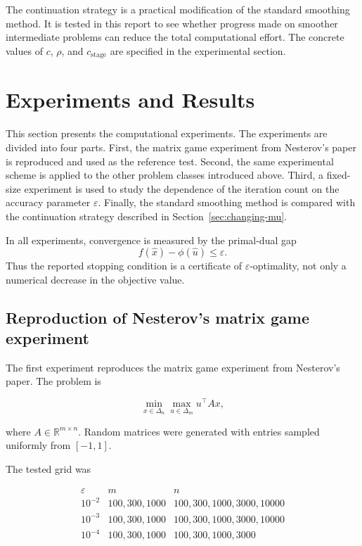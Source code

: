 \documentclass[11pt]{article}
\begin{document}
The continuation strategy is a practical modification of the standard smoothing
method. It is tested in this report to see whether progress made on smoother
intermediate problems can reduce the total computational effort. The concrete
values of \(c\), \(\rho\), and \(c_{\mathrm{stage}}\) are specified in the
experimental section.



\section{Experiments and Results}

This section presents the computational experiments. The experiments are divided
into four parts. First, the matrix game experiment from Nesterov's paper is
reproduced and used as the reference test. Second, the same experimental scheme
is applied to the other problem classes introduced above. Third, a fixed-size
experiment is used to study the dependence of the iteration count on the
accuracy parameter \(\varepsilon\). Finally, the standard smoothing method is
compared with the continuation strategy described in
Section~\ref{sec:changing-mu}.

In all experiments, convergence is measured by the primal-dual gap
\[
    f(\hat x)-\phi(\hat u)\le \varepsilon.
\]
Thus the reported stopping condition is a certificate of
\(\varepsilon\)-optimality, not only a numerical decrease in the objective
value.

\subsection{Reproduction of Nesterov's matrix game experiment}

The first experiment reproduces the matrix game experiment from Nesterov's
paper. The problem is

\[
    \min_{x\in\Delta_n}\max_{u\in\Delta_m}u^\top A x,
\]

where \(A\in\mathbb{R}^{m\times n}\). Random matrices were generated with
entries sampled uniformly from \([-1,1]\).

The tested grid was

\[
\begin{array}{c|c|c}
\varepsilon & m & n\\
\hline
10^{-2} & 100,300,1000 & 100,300,1000,3000,10000\\
10^{-3} & 100,300,1000 & 100,300,1000,3000,10000\\
10^{-4} & 100,300,1000 & 100,300,1000,3000
\end{array}
\]
\end{document}
